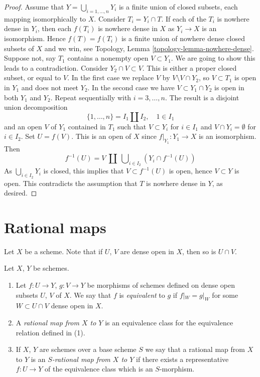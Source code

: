 \begin{proof}
\medskip\noindent
Assume that $Y = \bigcup_{i = 1, \ldots, n} Y_i$ is a finite union of
closed subsets, each mapping isomorphically to $X$. Consider
$T_i = Y_i \cap T$. If each of the $T_i$ is nowhere dense in $Y_i$,
then each $f(T_i)$ is nowhere dense in $X$ as $Y_i \to X$ is an isomorphism.
Hence $f(T) = f(T_i)$ is a finite union of nowhere dense closed
subsets of $X$ and we win, see
Topology, Lemma \ref{topology-lemma-nowhere-dense}.
Suppose not, say $T_1$ contains a nonempty open $V \subset Y_1$.
We are going to show this leads to a contradiction.
Consider $Y_2 \cap V \subset V$. This is either
a proper closed subset, or equal to $V$. In the first case we replace
$V$ by $V \setminus V \cap Y_2$, so $V \subset T_1$ is open in $Y_1$ and
does not meet $Y_2$. In the second case we have
$V \subset Y_1 \cap Y_2$ is open in both $Y_1$ and $Y_2$.
Repeat sequentially with $i = 3, \ldots, n$. The result is a disjoint
union decomposition
$$
\{1, \ldots, n\} = I_1 \amalg I_2, \quad 1 \in I_1
$$
and an open $V$ of $Y_1$ contained in $T_1$ such that $V \subset Y_i$
for $i \in I_1$ and $V \cap Y_i = \emptyset$ for $i \in I_2$. Set
$U = f(V)$. This is an open of $X$ since $f|_{Y_1} : Y_1 \to X$ is
an isomorphism. Then
$$
f^{-1}(U) = V\ \amalg\ \bigcup\nolimits_{i \in I_2} (Y_i \cap f^{-1}(U))
$$
As $\bigcup_{i \in I_2} Y_i$ is closed, this implies that
$V \subset f^{-1}(U)$ is open, hence $V \subset Y$ is open.
This contradicts the assumption that $T$ is nowhere dense in $Y$, as desired.
\end{proof}







\section{Rational maps}
\label{section-rational-maps}

\noindent
Let $X$ be a scheme. Note that if $U$, $V$ are dense open
in $X$, then so is $U \cap V$.

\begin{definition}
\label{definition-rational-map}
Let $X$, $Y$ be schemes.
\begin{enumerate}
\item Let $f : U \to Y$, $g : V \to Y$ be morphisms of schemes defined
on dense open subsets $U$, $V$ of $X$. We say that $f$ is
{\it equivalent} to $g$ if $f|_W = g|_W$ for some $W \subset U \cap V$
dense open in $X$.
\item A {\it rational map from $X$ to $Y$}
is an equivalence class for the equivalence relation defined in (1).
\item If $X$, $Y$ are schemes over a base scheme $S$ we say that
a rational map from $X$ to $Y$ is an {\it $S$-rational map from $X$
to $Y$} if there exists a representative $f : U \to Y$ of the equivalence
class which is an $S$-morphism.
\end{enumerate}
\end{definition}

